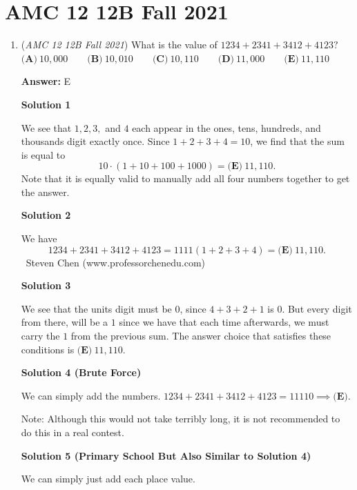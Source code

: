 \section{AMC 12 12B Fall 2021}
        \begin{enumerate}
        	\item (\textit{AMC 12 12B Fall 2021}) What is the value of $1234+2341+3412+4123?$
$\textbf{(A)}\: 10{,}000\qquad\textbf{(B)} \: 10{,}010\qquad\textbf{(C)} \: 10{,}110\qquad\textbf{(D)} \: 11{,}000\qquad\textbf{(E)} \: 11{,}110$

 \textbf{Answer: }E



\textbf{Solution 1}

We see that $1, 2, 3,$ and $4$ each appear in the ones, tens, hundreds, and thousands digit exactly once. Since $1+2+3+4=10$, we find that the sum is equal to 
 \[10\cdot(1+10+100+1000)=\boxed{\textbf{(E)} \: 11{,}110}.\]Note that it is equally valid to manually add all four numbers together to get the answer.

 



\textbf{Solution 2}

We have 
 \[1234 + 2341 + 3412 + 4123 = 1111 \left( 1 + 2 + 3 + 4 \right) = \boxed{\textbf{(E)} \: 11{,}110}.\]~Steven Chen (www.professorchenedu.com)

 



\textbf{Solution 3}

We see that the units digit must be $0$, since $4+3+2+1$ is $0$. But every digit from there, will be a $1$ since we have that each time afterwards, we must carry the $1$ from the previous sum. The answer choice that satisfies these conditions is $\boxed{\textbf{(E)} \: 11{,}110}$.

 



\textbf{Solution 4 (Brute Force)}

We can simply add the numbers. $1234 + 2341 + 3412 + 4123 = 11110 \implies \boxed{\textbf{(E)}}$.

 Note: Although this would not take terribly long, it is not recommended to do this in a real contest.

 



\textbf{Solution 5 (Primary School But Also Similar to Solution 4)}

We can simply just add each place value. 


\end{enumerate}
